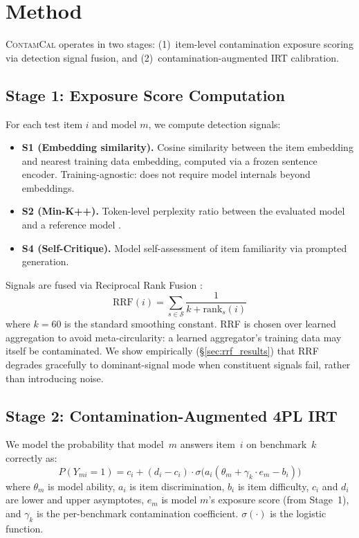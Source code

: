 \documentclass[11pt,a4paper]{article}
\newcommand{\contamcal}{\textsc{ContamCal}}
\begin{document}
\section{Method}
\label{sec:method}

\contamcal{} operates in two stages: (1)~item-level contamination exposure scoring via detection signal fusion, and (2)~contamination-augmented IRT calibration.

\subsection{Stage 1: Exposure Score Computation}
\label{sec:stage1}

For each test item $i$ and model $m$, we compute detection signals:
\begin{itemize}
\item \textbf{S1 (Embedding similarity).} Cosine similarity between the item embedding and nearest training data embedding, computed via a frozen sentence encoder. Training-agnostic: does not require model internals beyond embeddings.
\item \textbf{S2 (Min-K++).} Token-level perplexity ratio between the evaluated model and a reference model \cite{shi2024detecting}.
\item \textbf{S4 (Self-Critique).} Model self-assessment of item familiarity via prompted generation.
\end{itemize}

Signals are fused via Reciprocal Rank Fusion \cite{cormack2009rrf}:
\begin{equation}
\text{RRF}(i) = \sum_{s \in \mathcal{S}} \frac{1}{k + \text{rank}_s(i)}
\end{equation}
where $k=60$ is the standard smoothing constant. RRF is chosen over learned aggregation to avoid meta-circularity: a learned aggregator's training data may itself be contaminated. We show empirically (\S\ref{sec:rrf_results}) that RRF degrades gracefully to dominant-signal mode when constituent signals fail, rather than introducing noise.

\subsection{Stage 2: Contamination-Augmented 4PL IRT}
\label{sec:stage2}

We model the probability that model~$m$ answers item~$i$ on benchmark~$k$ correctly as:
\begin{equation}
P(Y_{mi} = 1) = c_i + (d_i - c_i) \cdot \sigma\bigl(a_i(\theta_m + \gamma_k \cdot e_m - b_i)\bigr)
\label{eq:4pl_gamma}
\end{equation}
where $\theta_m$ is model ability, $a_i$ is item discrimination, $b_i$ is item difficulty, $c_i$ and $d_i$ are lower and upper asymptotes, $e_m$ is model $m$'s exposure score (from Stage~1), and $\gamma_k$ is the per-benchmark contamination coefficient. $\sigma(\cdot)$ is the logistic function.
\end{document}
